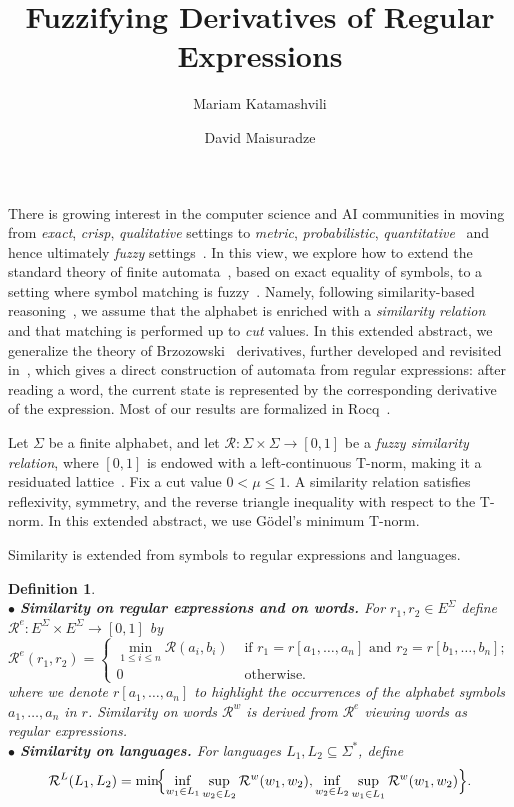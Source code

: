 \documentclass{easychair}
\title{Fuzzifying Derivatives of Regular Expressions}
\author{
Mariam Katamashvili\inst{1,2}
\and David Maisuradze\inst{1}
}
\institute{
Kutaisi International University, Kutaisi, Georgia
\and
VIAM, Tbilisi State University, Tbilisi, Georgia
}
\newtheorem{definition}{Definition}
\begin{document}
\maketitle
There is growing interest in the computer science and AI communities in moving from {\em exact}, {\em crisp}, {\em qualitative} settings to {\em metric}, {\em probabilistic}, {\em quantitative}~\cite{AlvesKesnerRamos2025,SilvaBonchiBonsangueRutten2011} and hence ultimately {\em fuzzy} settings~\cite{met05}. In this view, we explore how to extend the standard theory of finite automata~\cite{C71}, based on exact equality of symbols, to a setting where symbol matching is fuzzy~\cite{DHMM}. Namely, following similarity-based reasoning~\cite{Sessa2002},
we assume that the alphabet is enriched with a {\em similarity relation}
and that matching is performed up to {\em cut} values. In this extended abstract, we generalize the theory of
Brzozowski~\cite{B62} derivatives, further developed and revisited
in~\cite{OwensReppyTuron}, which gives a direct construction of automata
from regular expressions: after reading a word, the current state is represented by the
corresponding derivative of the expression. Most of our results are formalized in Rocq~\cite{Rocq}.

Let $\Sigma$ be a finite alphabet, and let
$\mathcal R:\Sigma\times\Sigma\to[0,1]$
be a {\em fuzzy similarity relation}, where $[0,1]$ is endowed with a
left-continuous T-norm, making it a residuated lattice~\cite{met05}.
Fix a cut value $0<\mu\le1$. A similarity relation satisfies reflexivity, symmetry, and the reverse triangle inequality with respect to the T-norm. In this extended abstract, we use G\"odel's minimum T-norm.

Similarity is extended from symbols to regular expressions and languages.
\begin{definition}\hfill\\
$\bullet$ \textbf{Similarity on regular expressions and on words.}
For $r_1,r_2\in E^\Sigma$ define
$
\mathcal R^e:E^\Sigma\times E^\Sigma\to[0,1]$
 by \[\mathcal R^{e}(r_1,r_2) =\begin{cases}\min_{1\leq i\leq n}\mathcal R(a_i,b_i) &\mbox{ if } r_1=r[a_1,\ldots,a_n]\mbox{ and }r_2 =r[b_1,\ldots,b_n];
\\ 
0& \mbox{ otherwise. }
\end{cases}
\] where we denote $r[a_1,\ldots,a_n]$ to highlight the occurrences of the alphabet symbols $a_1,\ldots,a_n$ in $r$. Similarity on words $\mathcal R^w$ is derived from $\mathcal R^e$ viewing words as regular expressions.\\
$\bullet$ \textbf{Similarity on languages.}
For languages $L_1,L_2\subseteq\Sigma^\ast$, define
\[
\mathcal R^L(L_1,L_2)
=
\min\!\Bigl\{
\inf_{w_1\in L_1}\sup_{w_2\in L_2}\mathcal R^w(w_1,w_2),
\inf_{w_2\in L_2}\sup_{w_1\in L_1}\mathcal R^w(w_1,w_2)
\Bigr\}.
\]\end{definition}
\end{document}
